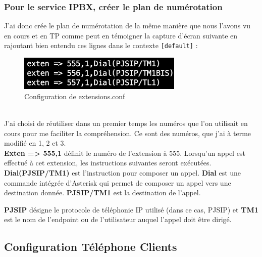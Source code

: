\documentclass[12pt, a4paper]{article}
\begin{document}
	\subsubsection{Pour le service IPBX, créer le plan de numérotation}
	J'ai donc crée le plan de numérotation de la même manière que nous l'avons vu en cours
	et en TP comme peut en témoigner la capture d'écran suivante en rajoutant bien 
	entendu ces lignes dans le contexte \texttt{[default]} :
	\begin{figure}[h]
		\centering
		\includegraphics[width=0.7\textwidth]{img/extensions.png}
		\caption{Configuration de extensions.conf}
		\label{fig:ext}
	\end{figure}\\
	J'ai choisi de réutiliser dans un premier temps les numéros que l'on utilisait
	en cours pour me faciliter la compréhension. Ce sont des numéros, que j'ai à terme 
	modifié en 1, 2 et 3.\\

	\textbf{Exten => 555,1} définit le numéro de l'extension à 555. Lorsqu'un 
	appel est effectué à cet extension, les instructions suivantes seront 
	exécutées. \textbf{Dial(PJSIP/TM1)} est l'instruction pour composer un 
	appel. \textbf{Dial} est une commande intégrée d'Asterisk qui permet de 
	composer un appel vers une destination donnée. \textbf{PJSIP/TM1} est la 
	destination de l'appel.
	
	\textbf{PJSIP} désigne le protocole de téléphonie IP utilisé 
	(dans ce cas, PJSIP) et \textbf{TM1} est le nom de l'endpoint ou 
	de l'utilisateur auquel l'appel doit être dirigé.

\subsection{Configuration Téléphone Clients}
\end{document}
